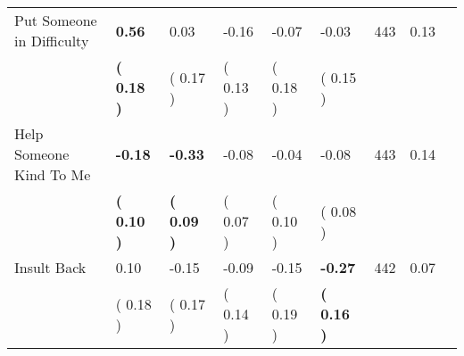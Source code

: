 \begin{tabular}{L{6.2cm} C{1.8cm} C{1.8cm} C{1.8cm} C{1.8cm} C{1.8cm} C{1.8cm} C{0.3cm} C{0.3cm}}
Put Someone in Difficulty & \textbf{     0.56} &      0.03 &     -0.16 &     -0.07 &     -0.03  & 443 &       0.13 \\ 
 & \textbf{(     0.18 )} & (     0.17 ) & (     0.13 ) & (     0.18 ) & (     0.15 )  & \\
Help Someone Kind To Me & \textbf{    -0.18} & \textbf{    -0.33} &     -0.08 &     -0.04 &     -0.08  & 443 &       0.14 \\ 
 & \textbf{(     0.10 )} & \textbf{(     0.09 )} & (     0.07 ) & (     0.10 ) & (     0.08 )  & \\
Insult Back &      0.10 &     -0.15 &     -0.09 &     -0.15 & \textbf{    -0.27}  & 442 &       0.07 \\ 
 & (     0.18 ) & (     0.17 ) & (     0.14 ) & (     0.19 ) & \textbf{(     0.16 )}  & \\
\bottomrule
\end{tabular}
